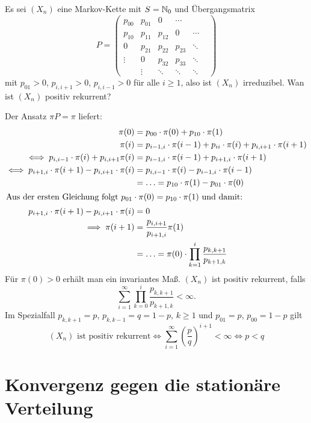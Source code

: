 \documentclass[a4paper,twoside,DIV15,BCOR12mm]{scrbook}
\begin{document}
\begin{beispiel}
\label{bsp:3.3}Es sei $(X_n)$ eine Markov-Kette mit $S=\mathbb{N}_0$ und Übergangsmatrix 
\[
P = 
\begin{pmatrix}
p_{00} & p_{01} & 0 & \cdots \\
p_{10} & p_{11} & p_{12} & 0 & \cdots \\
0 & p_{21} & p_{22} & p_{23} & \ddots \\
\vdots & 0 & p_{32} & p_{33}  & \ddots \\
 & \vdots &\ddots & \ddots & \ddots  & 
 \end{pmatrix}
\]
mit $p_{01}>0$, $p_{i,i+1}>0$, $p_{i,i-1}>0$ für alle $i\ge 1$, also ist $(X_n)$ irreduzibel. Wan ist $(X_n)$ positiv rekurrent? 

Der Ansatz $\pi P=\pi$ liefert:
\begin{align*}
\pi(0) &= p_{00} \cdot \pi(0) + p_{10}\cdot \pi(1) \\
\pi(i) &= p_{i-1,i}\cdot \pi(i-1) + p_{ii}\cdot \pi(i) + p_{i,i+1}\cdot\pi(i+1) \\
\iff p_{i,i-1}\cdot \pi(i) + p_{i,i+1} \pi(i) &= p_{i-1,i}\cdot \pi(i-1) + p_{i+1,i} \cdot \pi(i+1) \\
\iff p_{i+1,i}\cdot \pi(i+1) - p_{i,i+1}\cdot \pi(i) &= p_{i,i-1}\cdot \pi(i) - p_{i-1,i}\cdot \pi(i-1) \\
&= \ldots = p_{10}\cdot\pi(1) - p_{01}\cdot\pi(0) \\
\intertext{Aus der ersten Gleichung folgt $p_{01}\cdot\pi(0) = p_{10}\cdot\pi(1)$ und damit:}
p_{i+1,i}\cdot \pi(i+1) - p_{i,i+1}\cdot \pi(i) &= 0 \\
\implies \pi(i+1) &= \frac{p_{i,i+1}}{p_{i+1,i}} \pi(1) \\
&= \ldots = \pi(0) \cdot \prod_{k=1}^i \frac{p_{k,k+1}}{p_{k+1,k}}
\end{align*}
Für $\pi(0)>0$ erhält man ein invariantes Maß. $(X_n)$ ist positiv rekurrent, falls 
\[
\sum_{i=1}^\infty \prod_{k=0}^i \frac{p_{k,k+1}}{p_{k+1,k}} < \infty.
\]
Im Spezialfall $p_{k,k+1}=p$, $p_{k,k-1}=q=1-p$, $k\ge 1$ und $p_{01} = p$, $p_{00}=1-p$ gilt
\[
\text{$(X_n)$ ist positiv rekurrent} \iff \sum_{i=1}^\infty \left(\frac pq\right)^{i+1} < \infty \iff p<q
\]

\end{beispiel}

\section{Konvergenz gegen die stationäre Verteilung}
\end{document}
